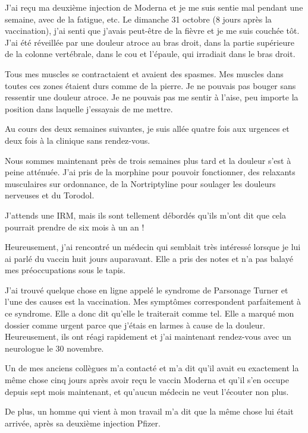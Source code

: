 J'ai reçu ma deuxième injection de Moderna et je me suis sentie mal pendant une
semaine, avec de la fatigue, etc. Le dimanche 31 octobre (8 jours après la
vaccination), j'ai senti que j'avais peut-être de la fièvre et je me suis
couchée tôt. J'ai été réveillée par une douleur atroce au bras droit, dans la
partie supérieure de la colonne vertébrale, dans le cou et l'épaule, qui
irradiait dans le bras droit.

Tous mes muscles se contractaient et avaient des spasmes. Mes muscles dans
toutes ces zones étaient durs comme de la pierre. Je ne pouvais pas bouger sans
ressentir une douleur atroce. Je ne pouvais pas me sentir à l'aise, peu importe
la position dans laquelle j'essayais de me mettre.

Au cours des deux semaines suivantes, je suis allée quatre fois aux urgences et
deux fois à la clinique sans rendez-vous.

Nous sommes maintenant près de trois semaines plus tard et la douleur s'est à
peine atténuée. J'ai pris de la morphine pour pouvoir fonctionner, des relaxants
musculaires sur ordonnance, de la Nortriptyline pour soulager les douleurs
nerveuses et du Torodol.

J'attends une IRM, mais ils sont tellement débordés qu'ils m'ont dit que cela
pourrait prendre de six mois à un an !

Heureusement, j'ai rencontré un médecin qui semblait très intéressé lorsque je
lui ai parlé du vaccin huit jours auparavant. Elle a pris des notes et n'a pas
balayé mes préoccupations sous le tapis.

J'ai trouvé quelque chose en ligne appelé le syndrome de Parsonage Turner et
l'une des causes est la vaccination. Mes symptômes correspondent parfaitement à
ce syndrome. Elle a donc dit qu'elle le traiterait comme tel. Elle a marqué mon
dossier comme urgent parce que j'étais en larmes à cause de la
douleur. Heureusement, ils ont réagi rapidement et j'ai maintenant rendez-vous
avec un neurologue le 30 novembre.

Un de mes anciens collègues m'a contacté et m'a dit qu'il avait eu exactement la
même chose cinq jours après avoir reçu le vaccin Moderna et qu'il s'en occupe
depuis sept mois maintenant, et qu'aucun médecin ne veut l'écouter non plus.

De plus, un homme qui vient à mon travail m'a dit que la même chose lui était
arrivée, après sa deuxième injection Pfizer.
